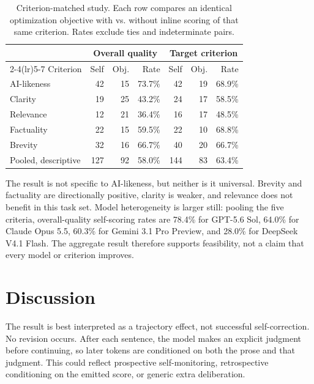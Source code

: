 \documentclass[11pt]{article}
\begin{document}
\begin{table}[t]
\centering
\caption{Criterion-matched study. Each row compares an identical optimization objective with vs. without inline scoring of that same criterion. Rates exclude ties and indeterminate pairs.}
\label{tab:matched}
\scriptsize
\begin{tabular}{lrrr@{\hspace{1.3em}}rrr}
\toprule
& \multicolumn{3}{c}{Overall quality} & \multicolumn{3}{c}{Target criterion} \\
\cmidrule(lr){2-4}\cmidrule(lr){5-7}
Criterion & Self & Obj. & Rate & Self & Obj. & Rate \\
\midrule
AI-likeness & 42 & 15 & 73.7\% & 42 & 19 & 68.9\% \\
Clarity & 19 & 25 & 43.2\% & 24 & 17 & 58.5\% \\
Relevance & 12 & 21 & 36.4\% & 16 & 17 & 48.5\% \\
Factuality & 22 & 15 & 59.5\% & 22 & 10 & 68.8\% \\
Brevity & 32 & 16 & 66.7\% & 40 & 20 & 66.7\% \\
\midrule
Pooled, descriptive & 127 & 92 & 58.0\% & 144 & 83 & 63.4\% \\
\bottomrule
\end{tabular}
\end{table}

The result is not specific to AI-likeness, but neither is it universal. Brevity and factuality are directionally positive, clarity is weaker, and relevance does not benefit in this task set. Model heterogeneity is larger still: pooling the five criteria, overall-quality self-scoring rates are 78.4\% for GPT-5.6 Sol, 64.0\% for Claude Opus 5.5, 60.3\% for Gemini 3.1 Pro Preview, and 28.0\% for DeepSeek V4.1 Flash. The aggregate result therefore supports feasibility, not a claim that every model or criterion improves.

\section{Discussion}

The result is best interpreted as a trajectory effect, not successful self-correction. No revision occurs. After each sentence, the model makes an explicit judgment before continuing, so later tokens are conditioned on both the prose and that judgment. This could reflect prospective self-monitoring, retrospective conditioning on the emitted score, or generic extra deliberation.
\end{document}
